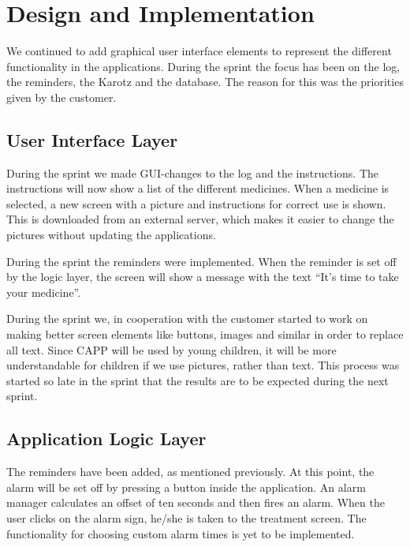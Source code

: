\section{Design and Implementation}
\label{sec:sprint3designAndImplementation}
We continued to add graphical user interface elements to represent the different functionality 
in the applications. During the sprint the focus has been on the log, the reminders, the Karotz and the database. 
The reason for this was the priorities given by the customer.  

\subsection{User Interface Layer}
During the sprint we made GUI-changes to the log and the instructions. The instructions will now 
show a list of the different medicines. When a medicine is selected, a new screen with a picture 
and instructions for correct use is shown. This is downloaded from an external server, which makes 
it easier to change the pictures without updating the applications. 


During the sprint the reminders were implemented. When the reminder is set off by the logic layer, 
the screen will show a message with the text ``It's time to take your medicine''. 

During the sprint we, in cooperation with the customer started to work on making better screen 
elements like buttons, images and similar in order to replace all text. Since CAPP 
will be used by young children, it will be more understandable for children if we use pictures, rather than text. This process was 
started so late in the sprint that the results are to be expected during the next sprint. 

\subsection{Application Logic Layer}
The reminders have been added, as mentioned previously. At this point, the alarm will be set off by 
pressing a button inside the application. An alarm manager calculates an offset of ten seconds and 
then fires an alarm. When the user clicks on the alarm sign, he/she is taken to the treatment screen. 
The functionality for choosing custom alarm times is yet to be implemented.

